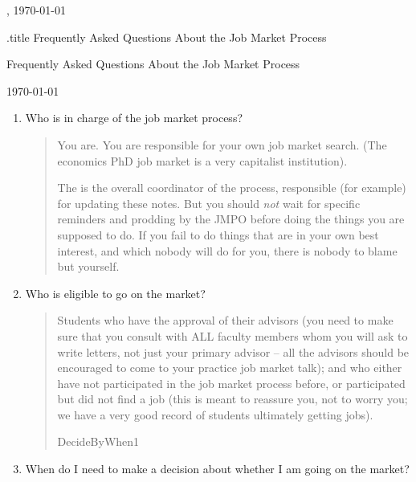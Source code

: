 \documentclass{\classes/econtex}
\providecommand\phantomsection{}
\begin{document}
\hfill{\tiny \jobname, \today} \vspace{.1in}

\begin{verbatimwrite}{\jobname.title}
  Frequently Asked Questions About the Job Market Process
\end{verbatimwrite}

\centerline{\Large Frequently Asked Questions About the Job Market Process}\medskip\medskip

\centerline{\today}\medskip\medskip

\ifdvi\large\fi

\begin{enumerate}

\item Who is in charge of the job market process?
  \begin{quote}
    You are.  You are responsible for your own job market search.  (The economics PhD job market is a very capitalist institution).

    The \JMPO is the overall coordinator of the process, responsible (for example) for updating these notes.  But you should \textit{not} wait for specific reminders and prodding by the JMPO before doing the things you are supposed to do. If you fail to do things that are in your own best interest, and which nobody will do for you, there is nobody to blame but yourself.

  \end{quote}

\item  Who is eligible to go on the market?
  \begin{quote}  
    Students who have the approval of their advisors (you need to make
    sure that you consult with ALL faculty members whom you will ask to
    write letters, not just your primary advisor -- all the advisors
    should be encouraged to come to your practice job market talk); and
    who either have not participated in the job market process before,
    or participated but did not find a job (this is meant to reassure
    you, not to worry you; we have a very good record of students
    ultimately getting jobs).

    \ifdvi\phantomsection\hypertarget{DecideByWhen0}{DecideByWhen1}\fi
    
  \end{quote}

\item  When do I need to make a decision about whether I am going on
  the market?


\end{enumerate}
\end{document}
